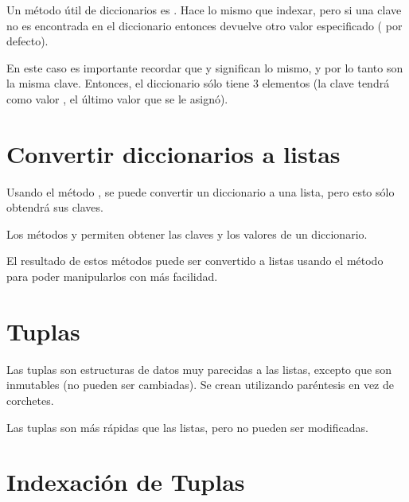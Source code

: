 Un método útil de diccionarios es .
Hace lo mismo que indexar, pero si una clave no es encontrada en el diccionario entonces devuelve otro valor especificado ( por defecto).


En este caso es importante recordar que  y  significan lo mismo, y por lo tanto son la misma clave.
Entonces, el diccionario  sólo tiene 3 elementos (la clave  tendrá como valor , el último valor que se le asignó).


\section{Convertir diccionarios a listas}

Usando el método , se puede convertir un diccionario a una lista, pero esto sólo obtendrá sus claves.


Los métodos  y  permiten obtener las claves y los valores de un diccionario.


El resultado de estos métodos puede ser convertido a listas usando el método  para poder manipularlos con más facilidad.


\section{Tuplas}

Las tuplas son estructuras de datos muy parecidas a las listas, excepto que son inmutables (no pueden ser cambiadas).
Se crean utilizando paréntesis en vez de corchetes.


Las tuplas son más rápidas que las listas, pero no pueden ser modificadas.

\section{Indexación de Tuplas}

